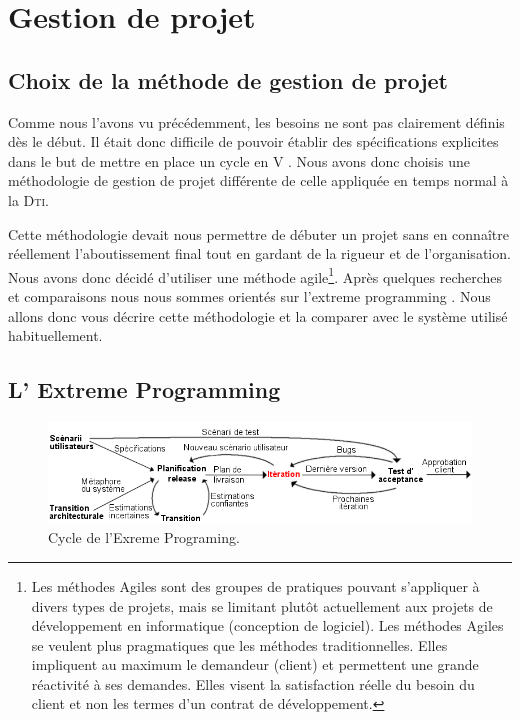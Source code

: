 \section{Gestion de projet}
    \subsection{Choix de la méthode de gestion de projet}
Comme nous l'avons vu précédemment, les besoins ne sont pas clairement définis dès le début. Il était donc difficile de pouvoir établir des spécifications explicites dans le but de mettre en place un cycle en V . Nous avons donc choisis une méthodologie de gestion de projet différente de celle appliquée en temps normal à la \textsc{Dti}.

Cette méthodologie devait nous permettre de débuter un projet sans en connaître réellement l'aboutissement final tout en gardant de la rigueur et de l'organisation. Nous avons donc décidé d'utiliser une méthode agile\footnote{Les méthodes Agiles sont des groupes de pratiques pouvant s'appliquer à divers types de projets, mais se limitant plutôt actuellement aux projets de développement en informatique (conception de logiciel). Les méthodes Agiles se veulent plus pragmatiques que les méthodes traditionnelles. Elles impliquent au maximum le demandeur (client) et permettent une grande réactivité à ses demandes. Elles visent la satisfaction réelle du besoin du client et non les termes d'un contrat de développement. }. Après quelques recherches et comparaisons nous nous sommes orientés sur l'extreme programming . Nous allons donc vous décrire cette méthodologie et la comparer avec le système utilisé habituellement.

    \subsection{L' Extreme Programming\label{extreme}}

\begin{figure}[!h]
\center
\includegraphics[width=15cm]{images/xp.png}
\caption{Cycle de l'Exreme Programing.}
\label{XP}
\end{figure}

